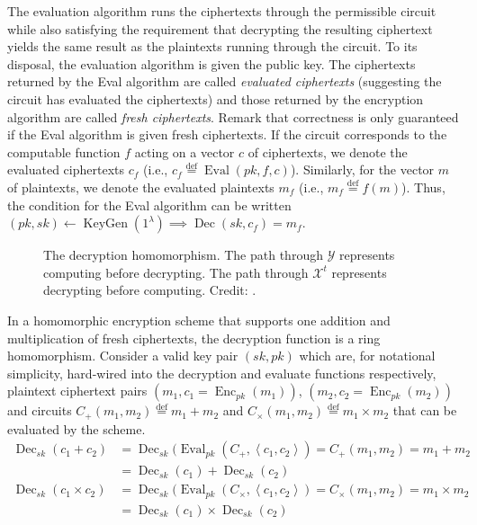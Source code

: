 The evaluation algorithm runs the ciphertexts through the permissible circuit while also satisfying the requirement that decrypting the resulting ciphertext yields the same result as the plaintexts running through the circuit. To its disposal, the evaluation algorithm is given the public key. The ciphertexts returned by the Eval algorithm are called \textit{evaluated ciphertexts} (suggesting the circuit has evaluated the ciphertexts) and those returned by the encryption algorithm are called \textit{fresh ciphertexts}. Remark that correctness is only guaranteed if the Eval algorithm is given fresh ciphertexts. If the circuit corresponds to the computable function $f$ acting on a vector $c$ of ciphertexts, we denote the evaluated ciphertexts $c_f$ (i.e., $c_f \stackrel{\mathrm{def}}{=} \operatorname{Eval}(pk, f, c)$). Similarly, for the vector $m$ of plaintexts, we denote the evaluated plaintexts $m_f$ (i.e., $m_f \stackrel{\mathrm{def}}{=} f(m)$). Thus, the condition for the Eval algorithm can be written $(pk,sk) \leftarrow \operatorname{KeyGen}(1^{\lambda}) \implies \operatorname{Dec}(sk, c_f) = m_f$.
\begin{figure}
    
    \caption{The decryption homomorphism. The path through $\mathcal{Y}$ represents computing before decrypting. The path through $\mathcal{X}^t$ represents decrypting before computing. Credit: \cite{Gen14-edge}.}
    \label{fig:homomorphism}
\end{figure}
In a homomorphic encryption scheme that supports one addition and multiplication of fresh ciphertexts, the decryption function is a ring homomorphism. Consider a valid key pair $(sk,pk)$ which are, for notational simplicity, hard-wired into the decryption and evaluate functions respectively, plaintext ciphertext pairs $(m_1,c_1 = \operatorname{Enc}_{pk}(m_1))$, $(m_2, c_2 = \operatorname{Enc}_{pk}(m_2))$ and circuits $C_+(m_1,m_2) \stackrel{\mathrm{def}}{=} m_1 + m_2$ and $C_{\times}(m_1,m_2) \stackrel{\mathrm{def}}{=} m_1 \times m_2$ that can be evaluated by the scheme. 
\begin{equation*}
\begin{aligned}
\operatorname{Dec}_{sk}(c_1 + c_2) &= \operatorname{Dec}_{sk}(\operatorname{Eval}_{pk}(C_+,\left\langle c_1,c_2 \right \rangle) = C_+(m_1,m_2) = m_1 + m_2 \\
    & = \operatorname{Dec}_{sk}(c_1) + \operatorname{Dec}_{sk}(c_2)\\
\operatorname{Dec}_{sk}(c_1 \times c_2) &= \operatorname{Dec}_{sk}(\operatorname{Eval}_{pk}(C_{\times},\left\langle c_1,c_2 \right \rangle) = C_{\times}(m_1,m_2) = m_1 \times m_2 \\
    & = \operatorname{Dec}_{sk}(c_1) \times \operatorname{Dec}_{sk}(c_2)
\end{aligned}
\end{equation*}

